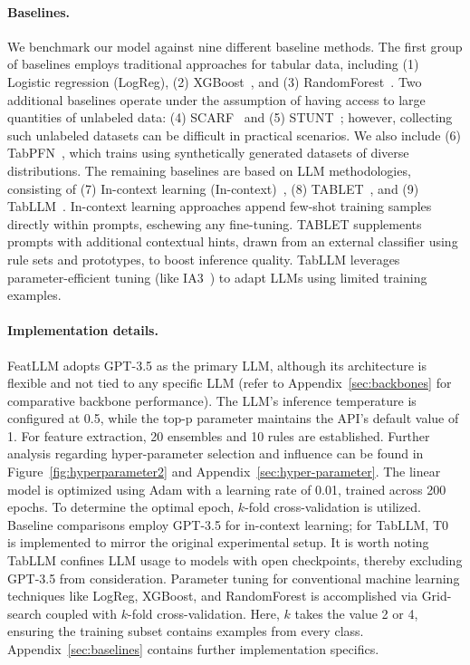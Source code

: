\vspace*{-0.12in}
\paragraph{Baselines.}
We benchmark our model against nine different baseline methods. The first group of baselines employs traditional approaches for tabular data, including (1) Logistic regression (LogReg), (2) XGBoost~\cite{chen2016xgboost}, and (3) RandomForest~\cite{ho1995random}. Two additional baselines operate under the assumption of having access to large quantities of unlabeled data: (4) SCARF~\cite{bahri2022scarf} and (5) STUNT~\cite{nam2023stunt}; however, collecting such unlabeled datasets can be difficult in practical scenarios. We also include (6) TabPFN~\cite{hollmann2022tabpfn}, which trains using synthetically generated datasets of diverse distributions. The remaining baselines are based on LLM methodologies, consisting of (7) In-context learning (In-context)~\cite{wei2022emergent}, (8) TABLET~\cite{slack2023tablet}, and (9) TabLLM~\cite{hegselmann2023tabllm}. In-context learning approaches append few-shot training samples directly within prompts, eschewing any fine-tuning. TABLET supplements prompts with additional contextual hints, drawn from an external classifier using rule sets and prototypes, to boost inference quality. TabLLM leverages parameter-efficient tuning (like IA3~\cite{liu2022few}) to adapt LLMs using limited training examples.

\vspace*{-0.12in}
\paragraph{Implementation details.}
\textsf{FeatLLM} adopts GPT-3.5 as the primary LLM, although its architecture is flexible and not tied to any specific LLM (refer to Appendix~\ref{sec:backbones} for comparative backbone performance). The LLM's inference temperature is configured at 0.5, while the top-p parameter maintains the API's default value of 1. For feature extraction, 20 ensembles and 10 rules are established. Further analysis regarding hyper-parameter selection and influence can be found in Figure~\ref{fig:hyperparameter2} and Appendix~\ref{sec:hyper-parameter}. The linear model is optimized using Adam with a learning rate of 0.01, trained across 200 epochs. To determine the optimal epoch, $k$-fold cross-validation is utilized. Baseline comparisons employ GPT-3.5 for in-context learning; for TabLLM, T0~\cite{sanh2022multitask} is implemented to mirror the original experimental setup. It is worth noting TabLLM confines LLM usage to models with open checkpoints, thereby excluding GPT-3.5 from consideration. Parameter tuning for conventional machine learning techniques like LogReg, XGBoost, and RandomForest is accomplished via Grid-search coupled with $k$-fold cross-validation. Here, $k$ takes the value 2 or 4, ensuring the training subset contains examples from every class. Appendix~\ref{sec:baselines} contains further implementation specifics.

